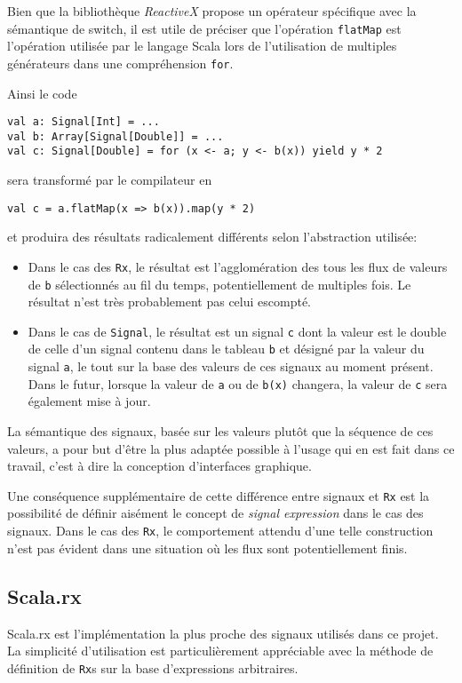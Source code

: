 Bien que la bibliothèque \emph{ReactiveX} propose un opérateur spécifique avec la sémantique de switch, il est utile de préciser que l'opération \texttt{flatMap} est l'opération utilisée par le langage Scala lors de l'utilisation de multiples générateurs dans une compréhension \texttt{for}.

Ainsi le code
\begin{lstlisting}
val a: Signal[Int] = ...
val b: Array[Signal[Double]] = ...
val c: Signal[Double] = for (x <- a; y <- b(x)) yield y * 2
\end{lstlisting}

sera transformé par le compilateur en
\begin{lstlisting}
val c = a.flatMap(x => b(x)).map(y * 2)
\end{lstlisting}

et produira des résultats radicalement différents selon l'abstraction utilisée:

\begin{itemize}
	\item Dans le cas des \texttt{Rx}, le résultat est l'agglomération des tous les flux de valeurs de \texttt{b} sélectionnés au fil du temps, potentiellement de multiples fois. Le résultat n'est très probablement pas celui escompté.
	
	\item Dans le cas de \texttt{Signal}, le résultat est un signal \texttt{c} dont la valeur est le double de celle d'un signal contenu dans le tableau \texttt{b} et désigné par la valeur du signal \texttt{a}, le tout sur la base des valeurs de ces signaux au moment présent. Dans le futur, lorsque la valeur de \texttt{a} ou de \texttt{b(x)} changera, la valeur de \texttt{c} sera également mise à jour.
\end{itemize}

La sémantique des signaux, basée sur les valeurs plutôt que la séquence de ces valeurs, a pour but d'être la plus adaptée possible à l'usage qui en est fait dans ce travail, c'est à dire la conception d'interfaces graphique.

Une conséquence supplémentaire de cette différence entre signaux et \texttt{Rx} est la possibilité de définir aisément le concept de \emph{signal expression} dans le cas des signaux. Dans le cas des \texttt{Rx}, le comportement attendu d'une telle construction n'est pas évident dans une situation où les flux sont potentiellement finis.

\subsection{Scala.rx} \label{sec:sig-comp-scalarx}
Scala.rx est l'implémentation la plus proche des signaux utilisés dans ce projet. La simplicité d'utilisation est particulièrement appréciable avec la méthode de définition de \texttt{Rx}s sur la base d'expressions arbitraires.


